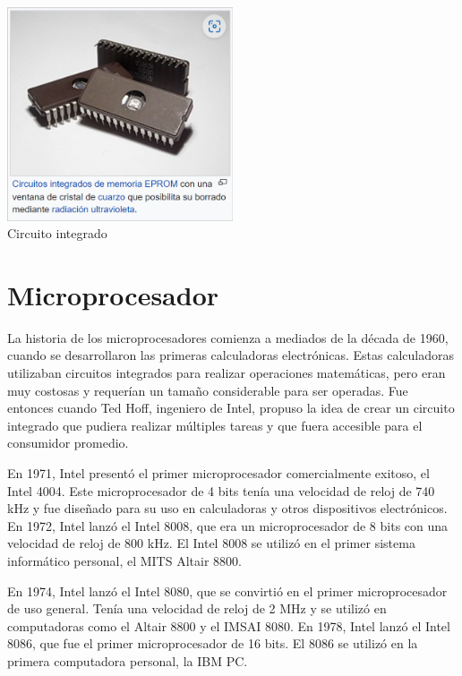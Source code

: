 \documentclass{article}
\begin{document}
\begin{center}
    \includegraphics[width=0.5\textwidth]{res/circuito_integrado.png}\\
    Circuito integrado
\end{center}


\section*{Microprocesador}

La historia de los microprocesadores comienza a mediados de la década de 1960, cuando se desarrollaron 
las primeras calculadoras electrónicas. Estas calculadoras utilizaban circuitos integrados 
para realizar operaciones matemáticas, pero eran muy costosas y requerían un tamaño considerable para ser operadas. 
Fue entonces cuando Ted Hoff, ingeniero de Intel, propuso la idea de crear un circuito integrado 
que pudiera realizar múltiples tareas y que fuera accesible para el consumidor promedio.

En 1971, Intel presentó el primer microprocesador comercialmente exitoso, el Intel 4004. 
Este microprocesador de 4 bits tenía una velocidad de reloj de 740 kHz y fue diseñado para su uso en calculadoras 
y otros dispositivos electrónicos. En 1972, Intel lanzó el Intel 8008, que era un microprocesador de 8 bits 
con una velocidad de reloj de 800 kHz. El Intel 8008 se utilizó en el primer sistema informático personal, 
el MITS Altair 8800.

En 1974, Intel lanzó el Intel 8080, que se convirtió en el primer microprocesador de uso general. 
Tenía una velocidad de reloj de 2 MHz y se utilizó en computadoras como el Altair 8800 y el IMSAI 8080. 
En 1978, Intel lanzó el Intel 8086, que fue el primer microprocesador de 16 bits. El 8086 se utilizó en 
la primera computadora personal, la IBM PC.
\end{document}

